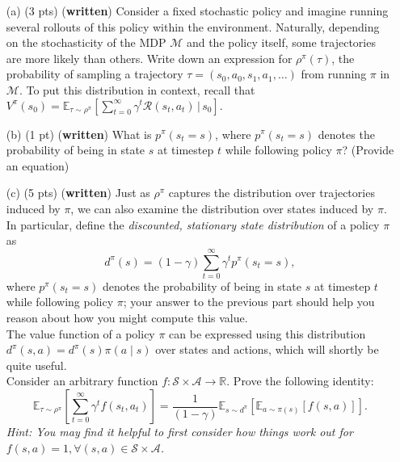 \documentclass{article}
\begin{document}
\begin{enumerate}
    \item [(a) (3 pts)] (\textbf{written}) Consider a fixed stochastic policy and imagine running several rollouts of this policy within the environment. Naturally, depending on the stochasticity of the MDP $\mathcal{M}$ and the policy itself, some trajectories are more likely than others. Write down an expression for $\rho^\pi(\tau)$, the probability of sampling a trajectory $\tau = (s_0,a_0,s_1,a_1,\ldots)$ from running $\pi$ in $\mathcal{M}$. To put this distribution in context, recall that $V^\pi(s_0) = \mathbb{E}_{\tau \sim \rho^\pi}\left[\sum\limits_{t=0}^\infty \gamma^t \mathcal{R}(s_t,a_t) \,|\, s_0\right].$ 
    \item [(b) (1 pt)] (\textbf{written}) What is $p^\pi(s_t=s)$, where $p^\pi(s_t = s)$ denotes the probability of being in state $s$ at timestep $t$ while following policy $\pi$? (Provide an equation) 
    \item [(c) (5 pts)] (\textbf{written}) Just as $\rho^\pi$ captures the distribution over trajectories induced by $\pi$, we can also examine the distribution over states induced by $\pi$. In particular, define the \textit{discounted, stationary state distribution} of a policy $\pi$ as $$d^\pi(s) = (1-\gamma) \sum\limits_{t=0}^\infty \gamma^t p^{\pi}(s_t = s),$$ where $p^\pi(s_t = s)$ denotes the probability of being in state $s$ at timestep $t$ while following policy $\pi$; your answer to the previous part should help you reason about how you might compute this value. 
\\
The value function of a policy $\pi$ can be expressed using this distribution $d^{\pi}(s,a) = d^{\pi}(s) \pi(a \mid s)$ over states and actions, which will shortly be quite useful.
 \\
 Consider an arbitrary function $f: \mathcal{S} \times \mathcal{A} \rightarrow \mathbb{R}$. Prove the following identity: $$\mathbb{E}_{\tau \sim \rho^\pi}\left[\sum\limits_{t=0}^\infty \gamma^t f(s_t,a_t)\right] = \frac{1}{(1-\gamma)} \mathbb{E}_{s \sim d^\pi}\left[\mathbb{E}_{a \sim \pi(s)}\left[f(s,a)\right]\right] .$$ 
	\emph{Hint: You may find it helpful to first consider how things work out for $f(s,a) = 1, \forall (s,a) \in \mathcal{S} \times \mathcal{A}$.}
\end{enumerate}	
\end{document}

